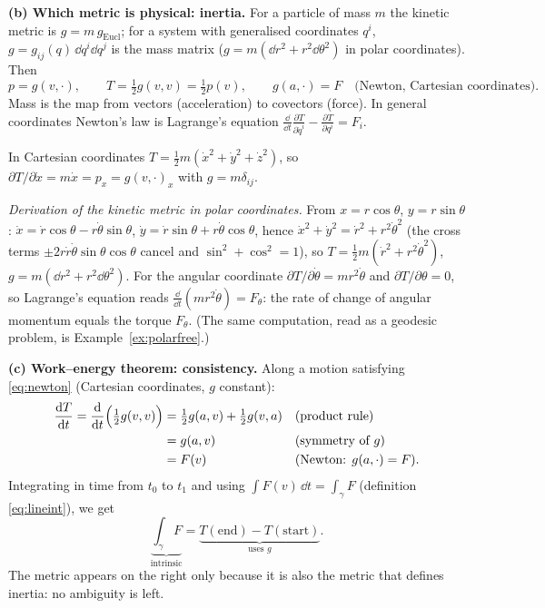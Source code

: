\textbf{(b) Which metric is physical: inertia.} For a particle of mass $m$ the kinetic metric is $g=m\,g_{\mathrm{Eucl}}$; for a system with generalised coordinates $q^i$, $g=g_{ij}(q)\,\dd q^i\dd q^j$ is the mass matrix (\eg $g=m(\dd r^2+r^2\dd\theta^2)$ in polar coordinates). Then
\begin{equation}\label{eq:newton}
p=g(v,\cdot),\qquad T=\tfrac12g(v,v)=\tfrac12p(v),\qquad g(a,\cdot)=F\quad\text{(Newton, Cartesian coordinates).}
\end{equation}
Mass is the map from vectors (acceleration) to covectors (force). In general coordinates Newton's law is Lagrange's equation $\frac{\dd}{\dd t}\frac{\partial T}{\partial\dot q^i}-\frac{\partial T}{\partial q^i}=F_i$.

\numcheck In Cartesian coordinates $T=\frac12m(\dot x^2+\dot y^2+\dot z^2)$, so $\partial T/\partial\dot x=m\dot x=p_x=g(v,\cdot)_x$ with $g=m\delta_{ij}$.

\emph{Derivation of the kinetic metric in polar coordinates.} From $x=r\cos\theta$, $y=r\sin\theta$: $\dot x=\dot r\cos\theta-r\dot\theta\sin\theta$, $\dot y=\dot r\sin\theta+r\dot\theta\cos\theta$, hence $\dot x^2+\dot y^2=\dot r^2+r^2\dot\theta^2$ (the cross terms $\pm2r\dot r\dot\theta\sin\theta\cos\theta$ cancel and $\sin^2+\cos^2=1$), so $T=\frac12m(\dot r^2+r^2\dot\theta^2)$, \ie $g=m(\dd r^2+r^2\dd\theta^2)$. For the angular coordinate $\partial T/\partial\dot\theta=mr^2\dot\theta$ and $\partial T/\partial\theta=0$, so Lagrange's equation reads $\frac{\dd}{\dd t}(mr^2\dot\theta)=F_\theta$: the rate of change of angular momentum equals the torque $F_\theta$.
(The same computation, read as a geodesic problem, is Example~\ref{ex:polarfree}.)

\textbf{(c) Work--energy theorem: consistency.} Along a motion satisfying \eqref{eq:newton} (Cartesian coordinates, $g$ constant):
\begin{align*}
\frac{\mathrm{d} T}{\mathrm{d} t}=\frac{\mathrm{d}}{\mathrm{d} t}\Bigl(\tfrac12g(v,v)\Bigr)&=\tfrac12g(a,v)+\tfrac12g(v,a) &&\text{(product rule)}\\
&=g(a,v) &&\text{(symmetry of $g$)}\\
&=F(v) &&\text{(Newton: $g(a,\cdot)=F$).}
\end{align*}
Integrating in time from $t_0$ to $t_1$ and using $\int F(v)\,\dd t=\int_\gamma F$ (definition \eqref{eq:lineint}), we get
\[
\underbrace{\int_\gamma F}_{\text{intrinsic}}=\underbrace{T(\text{end})-T(\text{start})}_{\text{uses }g}.
\]
The metric appears on the right only because it is also the metric that defines inertia: no ambiguity is left.

